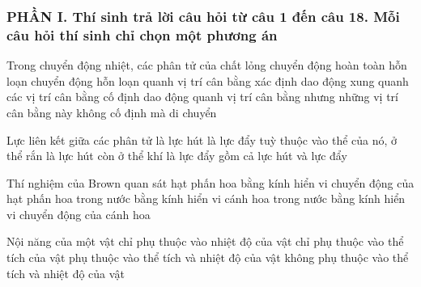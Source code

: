 \subsubsection*{PHẦN I. Thí sinh trả lời câu hỏi từ câu 1 đến câu 18. Mỗi câu hỏi thí sinh chỉ chọn một phương án}
\setcounter{ex}{0}
\begin{ex}
Trong chuyển động nhiệt, các phân tử của chất lỏng
\choice
{chuyển động hoàn toàn hỗn loạn}
{chuyển động hỗn loạn quanh vị trí cân bằng xác định}
{dao động xung quanh các vị trí cân bằng cố định}
{\True dao động quanh vị trí cân bằng nhưng những vị trí cân bằng này không cố định mà di chuyển}
\end{ex}
\begin{ex}
Lực liên kết giữa các phân tử	
\choice
{là lực hút}
{là lực đẩy}
{tuỳ thuộc vào thể của nó, ở thể rắn là lực hút còn ở thể khí là lực đẩy}
{\True gồm cả lực hút và lực đẩy}
\end{ex}
\begin{ex}
Thí nghiệm của Brown quan sát
\choice
{hạt phấn hoa bằng kính hiển vi}
{\True chuyển động của hạt phấn hoa trong nước bằng kính hiển vi}
{cánh hoa trong nước bằng kính hiển vi}
{chuyển động của cánh hoa}
\end{ex}
\begin{ex}
Nội năng của một vật
\choice
{chỉ phụ thuộc vào nhiệt độ của vật}
{chỉ phụ thuộc vào thể tích của vật}
{\True phụ thuộc vào thể tích và nhiệt độ của vật}
{không phụ thuộc vào thể tích và nhiệt độ của vật}
\end{ex}
